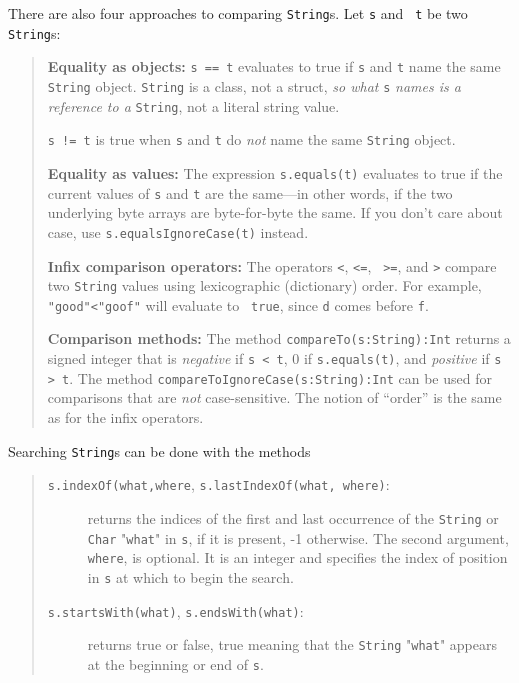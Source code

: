 There are also four approaches to comparing {\tt String}s. Let {\tt s} and {\tt
t} be two {\tt String}s:
\begin{quote}
{\bf Equality as objects:}  {\tt s == t} evaluates to true if {\tt s} and
{\tt t} name the same {\tt String} object.  {\tt String} is a class, not a
struct, {\em so what} {\tt s} {\em names is a reference to a } {\tt String}, not
a literal string value.

{\tt s != t} is true when {\tt s} and {\tt t} do {\em
not} name the same {\tt String} object.

{\bf Equality as values: }  The expression {\tt s.equals(t)} evaluates to 
true if the current values of {\tt s} and {\tt t} are the same---in other
words, if the two underlying byte arrays are byte-for-byte the same. 
If you don't care about case, use {\tt s.equalsIgnoreCase(t)} instead.

{\bf Infix comparison operators: } The operators {\tt <}, {\tt <=}, {\tt
>=}, and {\tt >} compare two {\tt String} values using lexicographic
(dictionary) order.   For example, {\tt "good"<"goof"} will evaluate to {\tt
true}, since {\tt d} comes before {\tt f}.

{\bf Comparison methods: } The method {\tt compareTo(s:String):Int}
returns a signed integer that is {\em negative} if {\tt s < t}, 0 if
{\tt s.equals(t)}, and {\em positive} if {\tt s > t}.
The method {\tt compare\-To\-Ignore\-Case(s:String):Int} can be used for
comparisons that are {\em not} case-sensitive.  The notion of ``order'' is
the same as for the infix operators.
\end{quote}

Searching {\tt String}s can be done with the methods
\begin{quote}
\begin{description}
\item[{\tt s.indexOf(what,where}, {\tt s.last\-IndexOf(what, where)}:] 
returns the indices of the first and last occurrence of the {\tt String}
or {\tt Char} "{\tt what}" in {\tt s}, if it is present, -1 otherwise.  The
second argument, {\tt where}, is optional.  It is an integer and specifies
the index of position in {\tt s} at which to begin the search.
\item[{\tt s.starts\-With(what)},  {\tt s.endsWith(what)}:]
returns true or false, true meaning that the {\tt String}  "{\tt what}" 
appears at the beginning or end of {\tt s}.
\end{description}
\end{quote}

